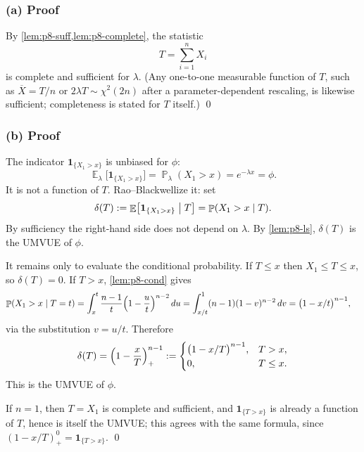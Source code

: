 \documentclass[11pt,a4paper]{article}
\DeclareMathOperator{\E}{\mathbb{E}}
\DeclareMathOperator{\Pbb}{\mathbb{P}}
\begin{document}
\subsubsection{(a) Proof}

By \cref{lem:p8-suff,lem:p8-complete}, the statistic
\[
T
=
\sum_{i=1}^n X_i
\]
is complete and sufficient for \(\lambda\). (Any one-to-one measurable function of \(T\), such as \(\overline{X}=T/n\) or \(2\lambda T\sim\chi^2(2n)\) after a parameter-dependent rescaling, is likewise sufficient; completeness is stated for \(T\) itself.)
\qed

\subsubsection{(b) Proof}

The indicator \(\mathbf{1}_{\{X_1>x\}}\) is unbiased for \(\phi\):
\[
\E_\lambda\bigl[\mathbf{1}_{\{X_1>x\}}\bigr]
=
\Pbb_\lambda(X_1>x)
=
e^{-\lambda x}
=
\phi.
\]
It is not a function of \(T\). Rao--Blackwellize it: set
\[
\delta(T)
:=
\E\bigl[\mathbf{1}_{\{X_1>x\}}\bigm|T\bigr]
=
\Pbb(X_1>x\mid T).
\]
By sufficiency the right-hand side does not depend on \(\lambda\). By \cref{lem:p8-ls}, \(\delta(T)\) is the UMVUE of \(\phi\).

It remains only to evaluate the conditional probability. If \(T\le x\) then \(X_1\le T\le x\), so \(\delta(T)=0\). If \(T>x\), \cref{lem:p8-cond} gives
\begin{align*}
\Pbb(X_1>x\mid T=t)
&=
\int_x^t\frac{n-1}{t}\Bigl(1-\frac{u}{t}\Bigr)^{n-2}\,du
=
\int_{x/t}^1(n-1)(1-v)^{n-2}\,dv
=
\bigl(1-x/t\bigr)^{n-1},
\end{align*}
via the substitution \(v=u/t\). Therefore
\[
\delta(T)
=
\Bigl(1-\frac{x}{T}\Bigr)_+^{n-1}
:=
\begin{cases}
\bigl(1-x/T\bigr)^{n-1},& T>x,\\
0,& T\le x.
\end{cases}
\]
This is the UMVUE of \(\phi\).

If \(n=1\), then \(T=X_1\) is complete and sufficient, and \(\mathbf{1}_{\{T>x\}}\) is already a function of \(T\), hence is itself the UMVUE; this agrees with the same formula, since \((1-x/T)_+^{0}=\mathbf{1}_{\{T>x\}}\).
\qed
\end{document}
